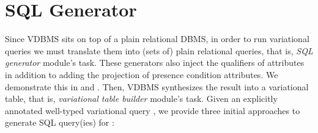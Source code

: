 \section{SQL Generator}
\label{sec:apps}


%
Since VDBMS sits on top of a plain relational DBMS, in order to run
variational queries we must translate them into (sets of) plain relational queries,
that is, \emph{SQL generator} module's task.
These generators also inject the qualifiers of attributes in addition to 
adding the projection of presence condition attributes. We demonstrate this
in  and .
Then, VDBMS synthesizes the result into a variational table, that is, 
\emph{variational table builder} module's task.
%
Given an explicitly annotated well-typed variational query \vQ,
we provide three initial 
approaches to generate SQL query(ies) for \vQ:
